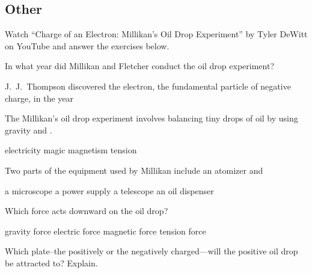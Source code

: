 \documentclass[]{exam}
\begin{document}
\subsection*{Other}   
\begin{questions}

\question
Watch ``Charge of an Electron: Millikan's Oil Drop Experiment'' by Tyler DeWitt on YouTube 
and answer the exercises below.

\question
In what year did Millikan and Fletcher conduct the oil drop experiment?

\begin{randomizechoices}
\end{randomizechoices}

\question
J.~J.~Thompson discovered the electron, the fundamental particle of negative charge, in the year \fillin[][3cm]

\begin{randomizechoices}
\end{randomizechoices}

\question
The Millikan's oil drop experiment involves balancing tiny drops of oil by using gravity and \fillin[][3cm].

\begin{randomizechoices}
    \correctchoice electricity
    \choice magic
    \choice magnetism
    \choice tension
\end{randomizechoices}

\question
Two parts of the equipment used by Millikan include an atomizer and 

\begin{randomizechoices}
    \correctchoice a microscope
    \choice a power supply
    \choice a telescope
    \choice an oil dispenser
\end{randomizechoices}

\question
Which force acts downward on the oil drop?

\begin{randomizechoices}
    \correctchoice gravity force
    \choice electric force
    \choice magnetic force
    \choice tension force
\end{randomizechoices}

\question
Which plate--the positively or the negatively charged---will the positive oil drop be attracted to? Explain.


\end{questions}
\end{document}
